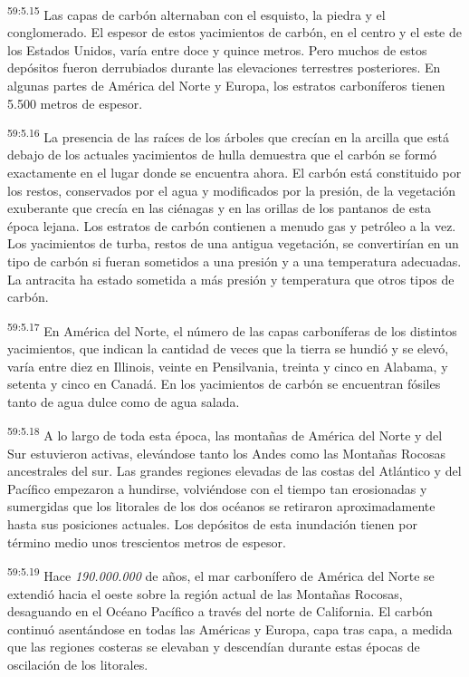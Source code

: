 \par
\textsuperscript{59:5.15} Las capas de carbón alternaban con el esquisto, la piedra y el conglomerado. El espesor de estos yacimientos de carbón, en el centro y el este de los Estados Unidos, varía entre doce y quince metros. Pero muchos de estos depósitos fueron derrubiados durante las elevaciones terrestres posteriores. En algunas partes de América del Norte y Europa, los estratos carboníferos tienen 5.500 metros de espesor.

\par
\textsuperscript{59:5.16} La presencia de las raíces de los árboles que crecían en la arcilla que está debajo de los actuales yacimientos de hulla demuestra que el carbón se formó exactamente en el lugar donde se encuentra ahora. El carbón está constituido por los restos, conservados por el agua y modificados por la presión, de la vegetación exuberante que crecía en las ciénagas y en las orillas de los pantanos de esta época lejana. Los estratos de carbón contienen a menudo gas y petróleo a la vez. Los yacimientos de turba, restos de una antigua vegetación, se convertirían en un tipo de carbón si fueran sometidos a una presión y a una temperatura adecuadas. La antracita ha estado sometida a más presión y temperatura que otros tipos de carbón.

\par
\textsuperscript{59:5.17} En América del Norte, el número de las capas carboníferas de los distintos yacimientos, que indican la cantidad de veces que la tierra se hundió y se elevó, varía entre diez en Illinois, veinte en Pensilvania, treinta y cinco en Alabama, y setenta y cinco en Canadá. En los yacimientos de carbón se encuentran fósiles tanto de agua dulce como de agua salada.

\par
\textsuperscript{59:5.18} A lo largo de toda esta época, las montañas de América del Norte y del Sur estuvieron activas, elevándose tanto los Andes como las Montañas Rocosas ancestrales del sur. Las grandes regiones elevadas de las costas del Atlántico y del Pacífico empezaron a hundirse, volviéndose con el tiempo tan erosionadas y sumergidas que los litorales de los dos océanos se retiraron aproximadamente hasta sus posiciones actuales. Los depósitos de esta inundación tienen por término medio unos trescientos metros de espesor.

\par
\textsuperscript{59:5.19} Hace \textit{190.000.000} de años, el mar carbonífero de América del Norte se extendió hacia el oeste sobre la región actual de las Montañas Rocosas, desaguando en el Océano Pacífico a través del norte de California. El carbón continuó asentándose en todas las Américas y Europa, capa tras capa, a medida que las regiones costeras se elevaban y descendían durante estas épocas de oscilación de los litorales.

